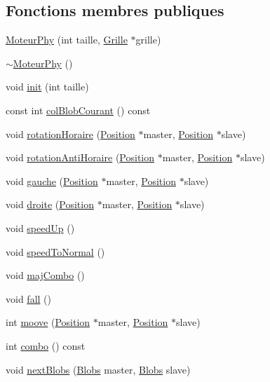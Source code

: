 \subsection*{Fonctions membres publiques}
\begin{DoxyCompactItemize}
\item 
\hyperlink{a00013_ac2fb9ac23086a274df6c4166a76875da}{MoteurPhy} (int taille, \hyperlink{a00009}{Grille} $\ast$grille)
\item 
\hyperlink{a00013_a8038b2b7dd00da0650ed594af52bd5d3}{$\sim$MoteurPhy} ()
\item 
void \hyperlink{a00013_aa2a69dd8dae77dc0172d9fb4d7b5fb60}{init} (int taille)
\item 
const int \hyperlink{a00013_afc5325d5fbbff1cd9c72b943726a02ea}{colBlobCourant} () const 
\item 
void \hyperlink{a00013_a28c33e603d5b4938e005b5cef1dff958}{rotationHoraire} (\hyperlink{a00014}{Position} $\ast$master, \hyperlink{a00014}{Position} $\ast$slave)
\item 
void \hyperlink{a00013_a48b81367d338f8887643db583281d8fb}{rotationAntiHoraire} (\hyperlink{a00014}{Position} $\ast$master, \hyperlink{a00014}{Position} $\ast$slave)
\item 
void \hyperlink{a00013_aff04c5ab8ca86434f15b2d09aeb4d3c4}{gauche} (\hyperlink{a00014}{Position} $\ast$master, \hyperlink{a00014}{Position} $\ast$slave)
\item 
void \hyperlink{a00013_ac552223e5740621815438cd1a4097b87}{droite} (\hyperlink{a00014}{Position} $\ast$master, \hyperlink{a00014}{Position} $\ast$slave)
\item 
void \hyperlink{a00013_a36aa8c6a3c53abab11d7c76e68fc5922}{speedUp} ()
\item 
void \hyperlink{a00013_a1a8f08b95399519bcb9b7393cce04f36}{speedToNormal} ()
\item 
void \hyperlink{a00013_af93e0d86f1ceaa2151892cec50ce4c49}{majCombo} ()
\item 
void \hyperlink{a00013_a7338064aa970bcfb13511b6feeedb258}{fall} ()
\item 
int \hyperlink{a00013_a333168582e7ceaa77b7575fab5a5c4fb}{moove} (\hyperlink{a00014}{Position} $\ast$master, \hyperlink{a00014}{Position} $\ast$slave)
\item 
int \hyperlink{a00013_ac7111dfbdee8744f40c2dd22dbb8b472}{combo} () const 
\item 
void \hyperlink{a00013_a7949b13ddb18140c687c5ff7d0c5c7c2}{nextBlobs} (\hyperlink{a00002}{Blobs} master, \hyperlink{a00002}{Blobs} slave)

\end{DoxyCompactItemize}
